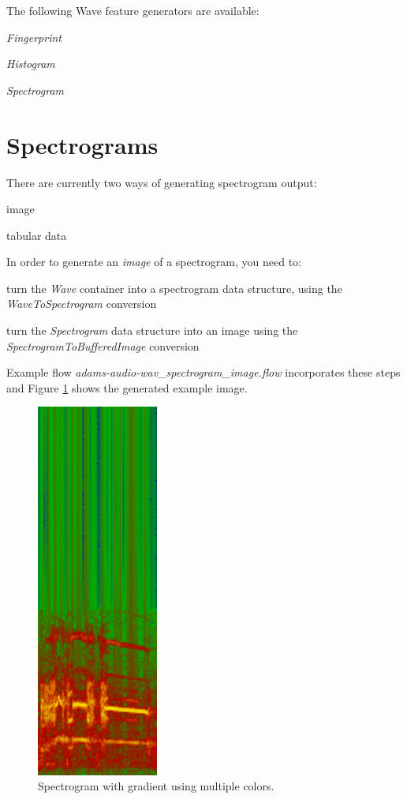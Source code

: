 \documentclass[a4paper]{book}
\begin{document}
\noindent The following Wave feature generators are available:
\begin{tight_itemize}
  \item \textit{Fingerprint}
  \item \textit{Histogram}
  \item \textit{Spectrogram}
\end{tight_itemize}

\section{Spectrograms}
There are currently two ways of generating spectrogram output:
\begin{tight_itemize}
  \item image
  \item tabular data
\end{tight_itemize}

\noindent In order to generate an \textit{image} of a spectrogram, you need to:
\begin{tight_itemize}
  \item turn the \textit{Wave} container into a spectrogram data structure,
  using the \textit{WaveToSpectrogram} conversion
  \item turn the \textit{Spectrogram} data structure into an image using
  the \textit{SpectrogramToBufferedImage} conversion
\end{tight_itemize}
Example flow \textit{adams-audio-wav\_spectrogram\_image.flow} incorporates
these steps and Figure \ref{spectrogram} shows the generated example image.

\begin{figure}[htb]
  \centering
  \includegraphics[width=4.0cm]{images/spectrogram.png}
  \caption{Spectrogram with gradient using multiple colors.}
  \label{spectrogram}
\end{figure}
\end{document}
